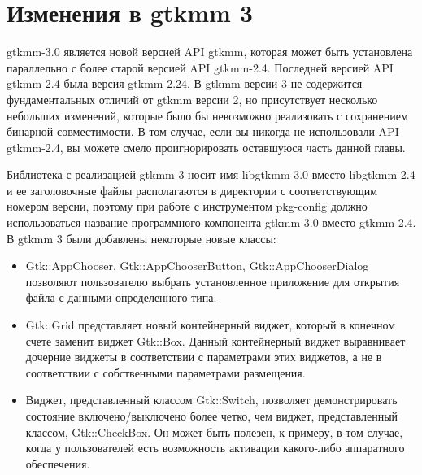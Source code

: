 \chapter{Изменения в gtkmm 3}
 gtkmm-3.0 является новой версией API gtkmm, которая может быть установлена параллельно с более старой версией API gtkmm-2.4. Последней версией API gtkmm-2.4 была версия gtkmm 2.24. В gtkmm версии 3 не содержится фундаментальных отличий от gtkmm версии 2, но присутствует несколько небольших изменений, которые было бы невозможно реализовать с сохранением бинарной совместимости. В том случае, если вы никогда не использовали API gtkmm-2.4, вы можете смело проигнорировать оставшуюся часть данной главы.

Библиотека с реализацией gtkmm 3 носит имя libgtkmm-3.0 вместо libgtkmm-2.4 и ее заголовочные файлы располагаются в директории с соответствующим номером версии, поэтому при работе с инструментом pkg-config должно использоваться название программного компонента gtkmm-3.0 вместо gtkmm-2.4.
В gtkmm 3 были добавлены некоторые новые классы:
\begin{itemize}
	\item Gtk::AppChooser, Gtk::AppChooserButton, Gtk::AppChooserDialog позволяют пользователю выбрать установленное приложение для открытия файла с данными определенного типа.
	\item Gtk::Grid представляет новый контейнерный виджет, который в конечном счете заменит виджет Gtk::Box. Данный контейнерный виджет выравнивает дочерние виджеты в соответствии с параметрами этих виджетов, а не в соответствии с собственными параметрами размещения.
	\item Виджет, представленный классом Gtk::Switch, позволяет демонстрировать состояние включено/выключено более четко, чем виджет, представленный классом, Gtk::CheckBox. Он может быть полезен, к примеру, в том случае, когда у пользователей есть возможность активации какого-либо аппаратного обеспечения.
	
\end{itemize}

